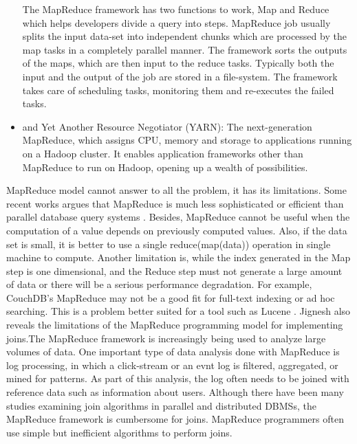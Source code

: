 \documentclass[10pt, conference]{IEEEtran}
\begin{document}
\begin{itemize}
\indent The MapReduce framework has two functions to work, Map and Reduce which helps developers divide a query into steps. MapReduce job usually splits the input data-set into independent chunks which are processed by the map tasks in a completely parallel manner. The framework sorts the outputs of the maps, which are then input to the reduce tasks. Typically both the input and the output of the job are stored in a file-system. The framework takes care of scheduling tasks, monitoring them and re-executes the failed tasks.\\
\item and Yet Another Resource Negotiator (YARN): The next-generation MapReduce, which assigns CPU, memory and storage to applications running on a Hadoop cluster. It enables application frameworks other than MapReduce to run on Hadoop, opening up a wealth of possibilities.
\end{itemize}

MapReduce model cannot answer to all the problem, it has its limitations. Some recent works argues that MapReduce is much less sophisticated or efficient than parallel database query systems \cite{dewitt2008mapreduce}. Besides, MapReduce cannot be useful when the computation of a value depends on previously computed values. Also, if the data set is small, it is better to use a single reduce(map(data)) operation in single machine to compute. Another limitation is, while the index generated in the Map step is one dimensional, and the Reduce step must not generate a large amount of data or there will be a serious performance degradation. For example, CouchDB’s MapReduce may not be a good fit for full-text indexing or ad hoc searching. This is a problem better suited for a tool such as Lucene \cite{limit1}. Jignesh \cite{blanas2010comparison} also reveals the limitations of the MapReduce programming model for implementing joins.The MapReduce framework is increasingly being used to analyze large volumes of data. One important type of data analysis done with MapReduce is log processing, in which a click-stream or an evnt log is filtered, aggregated, or mined for patterns. As part of this analysis, the log often needs to be joined with reference data such as information about users. Although there have been many studies examining join algorithms in parallel and distributed DBMSs, the MapReduce framework is cumbersome for joins. MapReduce programmers often use simple but inefficient algorithms to perform joins.
\end{document}
